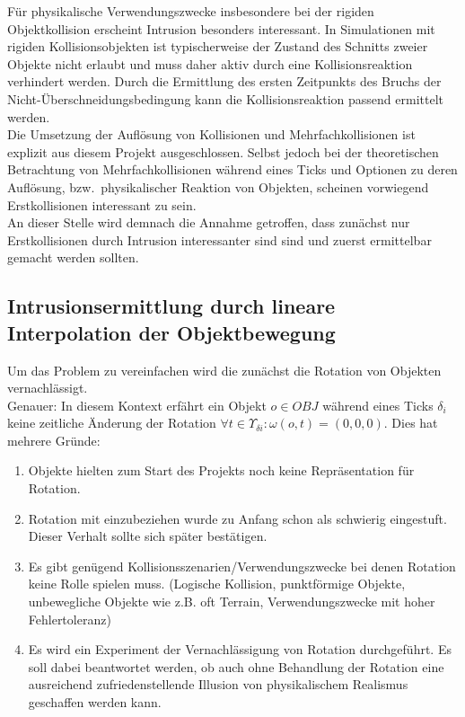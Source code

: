 Für physikalische Verwendungszwecke insbesondere bei der rigiden Objektkollision erscheint Intrusion besonders interessant. In Simulationen mit rigiden Kollisionsobjekten ist typischerweise der Zustand des Schnitts zweier Objekte nicht erlaubt und muss daher aktiv durch eine Kollisionsreaktion verhindert werden. Durch die Ermittlung des ersten Zeitpunkts des Bruchs der Nicht-Überschneidungsbedingung kann die Kollisionsreaktion passend ermittelt werden.\\
Die Umsetzung der Auflösung von Kollisionen und Mehrfachkollisionen ist explizit aus diesem Projekt ausgeschlossen. Selbst jedoch bei der theoretischen Betrachtung von Mehrfachkollisionen während eines Ticks und Optionen zu deren Auflösung, bzw.~physikalischer Reaktion von Objekten, scheinen vorwiegend Erstkollisionen interessant zu sein.\\
An dieser Stelle wird demnach die Annahme getroffen, dass zunächst nur Erstkollisionen durch Intrusion interessanter sind sind und zuerst ermittelbar gemacht werden sollten.



\subsection{Intrusionsermittlung durch lineare Interpolation der Objektbewegung}
\label{sec:linear_int}
Um das Problem zu vereinfachen wird die zunächst die Rotation von Objekten vernachlässigt.\\
Genauer: In diesem Kontext erfährt ein Objekt $o\in OBJ$ während eines Ticks $\delta_i$ keine zeitliche Änderung der Rotation $\forall t \in \Upsilon_{\delta i} : \omega(o, t) = (0,0,0)$. Dies hat mehrere Gründe:
\begin{enumerate}
\item Objekte hielten zum Start des Projekts noch keine Repräsentation für Rotation.
\item Rotation mit einzubeziehen wurde zu Anfang schon als schwierig eingestuft. Dieser Verhalt sollte sich später bestätigen.
\item Es gibt genügend Kollisionsszenarien/Verwendungszwecke bei denen Rotation keine Rolle spielen muss. (Logische Kollision, punktförmige Objekte, unbewegliche Objekte wie z.B. oft Terrain, Verwendungszwecke mit hoher Fehlertoleranz)
\item Es wird ein Experiment der Vernachlässigung von Rotation durchgeführt. Es soll dabei beantwortet werden, ob auch ohne Behandlung der Rotation eine ausreichend zufriedenstellende Illusion von physikalischem Realismus geschaffen werden kann.
\end{enumerate}

